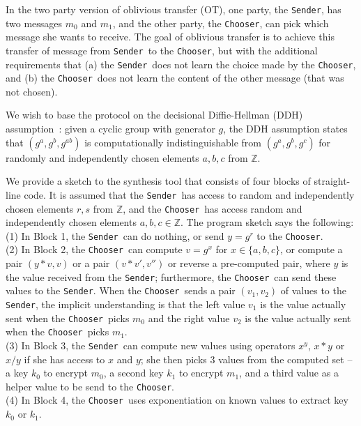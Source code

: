 \documentclass[preprint]{sig-alternate-05-2015}
\def\sender{{\tt{Sender}}}
\def\chooser{{\tt{Chooser}}}
\begin{document}
In the two party version of oblivious transfer (OT), 
one party, the \sender, has two messages $m_0$ and $m_1$,
and the other party, the \chooser, can pick which message she wants to receive.
The goal of oblivious transfer is to achieve this transfer of
message from \sender\ to the \chooser, but with the additional
requirements that
(a) the \sender\ does not learn the choice made by the \chooser,
and
(b) the \chooser\ does not learn the content of the other message 
(that was not chosen).

We wish to base the protocol on the decisional Diffie-Hellman (DDH) assumption~\cite{Boneh:DDH}:
given a cyclic group with generator $g$, the DDH assumption states that
$(g^a,g^b,g^{ab})$ is computationally indistinguishable from
$(g^a,g^b,g^c)$ for randomly and independently chosen elements $a,b,c$ from $\mathbb{Z}$.


We provide a sketch to the synthesis tool that consists of four blocks of straight-line code.
It is assumed that the \sender\ has access to random and independently chosen elements 
$r,s$ from $\mathbb{Z}$, and the \chooser\ has access random and independently chosen
elements $a,b,c\in\mathbb{Z}$.  The program sketch says the following:
\\
(1) In Block 1, the \sender\ can do nothing, or send $y=g^r$ to the \chooser.
\\
(2) In Block 2, the \chooser\ can compute $v=g^x$ for $x\in\{a,b,c\}$, or compute
a pair $(y*v,v)$ or a pair $(v*v',v'')$ or reverse a pre-computed pair, 
where $y$ is the value received from the \sender; furthermore,
the \chooser\ can send these values to the \sender.
When the \chooser\ sends a pair $(v_1,v_2)$ of values to the \sender, 
the implicit understanding is that
the left value $v_1$ is the value actually sent when the \chooser\ picks $m_0$ and 
the right value $v_2$ is the value actually sent when the \chooser\ picks $m_1$.
\\
(3) In Block 3, the \sender\ can compute new values using operators
$x^y$, $x*y$ or $x/y$ if she has access to $x$ and $y$;
she then picks 3 values from the 
computed set -- a key $k_0$ to
encrypt $m_0$, a second key $k_1$ to encrypt $m_1$, and a third value as a helper value
to be send to the \chooser.
\\
(4) In Block 4, the \chooser\ uses exponentiation on known values to extract key $k_0$ or $k_1$.
\end{document}
